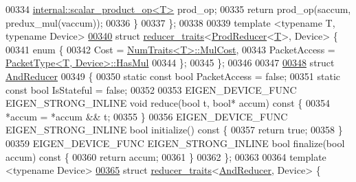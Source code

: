 \begin{DoxyCode}
00334     \hyperlink{struct_eigen_1_1internal_1_1scalar__product__op}{internal::scalar\_product\_op<T>} prod\_op;
00335     \textcolor{keywordflow}{return} prod\_op(saccum, predux\_mul(vaccum));
00336   \}
00337 \};
00338 
00339 \textcolor{keyword}{template} <\textcolor{keyword}{typename} T, \textcolor{keyword}{typename} Device>
\hyperlink{struct_eigen_1_1internal_1_1reducer__traits_3_01_prod_reducer_3_01_t_01_4_00_01_device_01_4}{00340} \textcolor{keyword}{struct }\hyperlink{struct_eigen_1_1internal_1_1reducer__traits}{reducer\_traits}<\hyperlink{struct_eigen_1_1internal_1_1_prod_reducer}{ProdReducer}<\hyperlink{group___sparse_core___module}{T}>, Device> \{
00341   \textcolor{keyword}{enum} \{
00342     Cost = \hyperlink{group___core___module_struct_eigen_1_1_num_traits}{NumTraits<T>::MulCost},
00343     PacketAccess = \hyperlink{struct_eigen_1_1_packet_type}{PacketType<T, Device>::HasMul}
00344   \};
00345 \};
00346 
00347 
\hyperlink{struct_eigen_1_1internal_1_1_and_reducer}{00348} \textcolor{keyword}{struct }\hyperlink{struct_eigen_1_1internal_1_1_and_reducer}{AndReducer}
00349 \{
00350   \textcolor{keyword}{static} \textcolor{keyword}{const} \textcolor{keywordtype}{bool} PacketAccess = \textcolor{keyword}{false};
00351   \textcolor{keyword}{static} \textcolor{keyword}{const} \textcolor{keywordtype}{bool} IsStateful = \textcolor{keyword}{false};
00352 
00353   EIGEN\_DEVICE\_FUNC EIGEN\_STRONG\_INLINE \textcolor{keywordtype}{void} reduce(\textcolor{keywordtype}{bool} t, \textcolor{keywordtype}{bool}* accum)\textcolor{keyword}{ const }\{
00354     *accum = *accum && t;
00355   \}
00356   EIGEN\_DEVICE\_FUNC EIGEN\_STRONG\_INLINE \textcolor{keywordtype}{bool} initialize()\textcolor{keyword}{ const }\{
00357     \textcolor{keywordflow}{return} \textcolor{keyword}{true};
00358   \}
00359   EIGEN\_DEVICE\_FUNC EIGEN\_STRONG\_INLINE \textcolor{keywordtype}{bool} finalize(\textcolor{keywordtype}{bool} accum)\textcolor{keyword}{ const }\{
00360     \textcolor{keywordflow}{return} accum;
00361   \}
00362 \};
00363 
00364 \textcolor{keyword}{template} <\textcolor{keyword}{typename} Device>
\hyperlink{struct_eigen_1_1internal_1_1reducer__traits_3_01_and_reducer_00_01_device_01_4}{00365} \textcolor{keyword}{struct }\hyperlink{struct_eigen_1_1internal_1_1reducer__traits}{reducer\_traits}<\hyperlink{struct_eigen_1_1internal_1_1_and_reducer}{AndReducer}, Device> \{

\end{DoxyCode}
